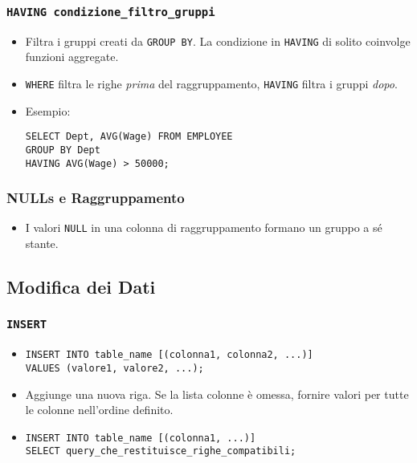 \subsubsection{\texttt{HAVING condizione\_filtro\_gruppi}}
\begin{itemize}
	\item Filtra i gruppi creati da \texttt{GROUP BY}. La condizione in \texttt{HAVING} di solito coinvolge funzioni aggregate.
	\item \texttt{WHERE} filtra le righe \textit{prima} del raggruppamento, \texttt{HAVING} filtra i gruppi \textit{dopo}.
	\item Esempio:
	\begin{verbatim}
SELECT Dept, AVG(Wage) FROM EMPLOYEE
GROUP BY Dept
HAVING AVG(Wage) > 50000;
	\end{verbatim}
\end{itemize}

\subsubsection{NULLs e Raggruppamento}
\begin{itemize}
	\item I valori \texttt{NULL} in una colonna di raggruppamento formano un gruppo a sé stante.
\end{itemize}

\subsection{Modifica dei Dati}
\subsubsection{\texttt{INSERT}}
\begin{itemize}
	\item
	\begin{verbatim}
INSERT INTO table_name [(colonna1, colonna2, ...)]
VALUES (valore1, valore2, ...);
	\end{verbatim}
	\item Aggiunge una nuova riga. Se la lista colonne è omessa, fornire valori per tutte le colonne nell'ordine definito.
	\item
	\begin{verbatim}
INSERT INTO table_name [(colonna1, ...)]
SELECT query_che_restituisce_righe_compatibili;
	\end{verbatim}
\end{itemize}

